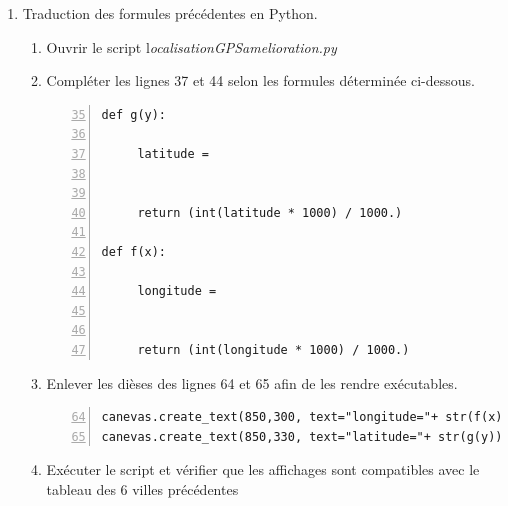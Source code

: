 \documentclass[a4paper,10pt]{article}
\begin{document}
\begin{enumerate}
\item Traduction des formules précédentes en Python.


\begin{enumerate}
\item Ouvrir le script  l\textit{ocalisationGPSamelioration.py}
\item Compléter les lignes 37 et 44 selon les formules déterminée ci-dessous.


\begin{lstlisting}[numbers=left,firstnumber=35]
def g(y):
     	
     latitude =   
     
	
     return (int(latitude * 1000) / 1000.)

def f(x):
     	
     longitude =  
     
	
     return (int(longitude * 1000) / 1000.)

\end{lstlisting}

\item Enlever les dièses  des lignes 64 et 65 afin de les rendre exécutables.
\begin{lstlisting}[numbers=left,firstnumber=64]
canevas.create_text(850,300, text="longitude="+ str(f(x)),fill='red')  
canevas.create_text(850,330, text="latitude="+ str(g(y)),fill='blue')   
\end{lstlisting}   
\item Exécuter le script et vérifier que les affichages sont compatibles avec le tableau des 6 villes précédentes

\end{enumerate}
    
\end{enumerate}
\end{document}
